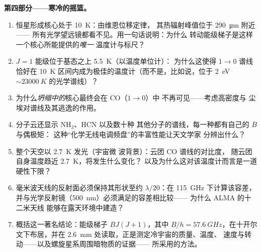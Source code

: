 \begin{problem}
\medskip\noindent\textbf{第四部分——寒冷的摇篮。}
\begin{enumerate}[resume]
  \item 恒星形成核心处于 \qty{10}{K}：由维恩位移定律，
        其热辐射峰值位于 \qty{290}{\micro m} 附近——
        所有光学望远镜都看不见。用一句话说明：为什么
        转动能级梯子是这样一个核心所能提供的\emph{唯一}
        温度计与标尺？
  \item $J = 1$ 能级位于基态之上 \qty{5.5}{K}（以温度单位计）：
        为什么这使得 $1\to0$ 谱线
        恰好在 \qty{10}{K}
        区间内成为极佳的温度计（而不是，比如说，位于
        \qty{2}{eV} $\sim \qty{23000}{K}$ 的光学谱线）？
  \item 为什么\emph{坍缩中的}核心最终会在 CO（$1\to0$）中
        不再可见——考虑高密度与
        尘埃对谱线及其逃逸的作用。
  \item 分子云还显示 NH$_3$、HCN 以及数十种
        其他分子的谱线，每一种都有自己的 $B$ 与偶极矩：
        这种“化学无线电调频盘”的丰富性能让天文学家
        分辨出什么？
  \item 整个天空以 \qty{2.7}{K} 发光（宇宙微
        波背景）：云团 CO 谱线的对比度，
        随云团自身温度趋近 \qty{2.7}{K}，将发生什么变化？
        以及为什么这对该温度计而言是一道
        硬性下限？
  \item 毫米波天线的反射面必须保持其形状至约
        $\lambda/20$：在 \qty{115}{GHz} 下计算该容差，
        并与光学反射镜（\qty{500}{nm}）必须满足的容差相比较——
        为什么 ALMA 的十二米天线
        能够在露天环境中建造？
  \item 概括这一著名结论：能级梯子 $BJ(J+1)$，其中 $B/h =
        \qty{57.6}{GHz}$，在十开尔文下布居，并在
        \qty{2.6}{mm} 处读取，正是测定冷宇宙的质量、温度、
        速度与转动——以及螺旋星系周围暗物质的证据——
        所采用的方法。
\end{enumerate}
\end{problem}
